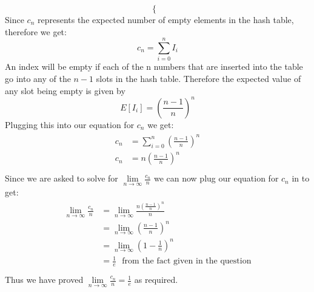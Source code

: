 \documentclass[12pt]{article}
\begin{document}
\begin{adjustwidth}{0em}{0pt}
\[\begin{cases}
\end{cases} \]
Since $c_n$ represents the expected number of empty elements in the hash table, therefore we get:
\[ c_n = \sum^{n}_{i=0}I_i \]
An index will be empty if each of the n numbers that are inserted into the table go into any of the $n-1$ slots in the hash table. Therefore the expected value of any slot being empty is given by
\[ E[I_i] = (\frac{n-1}{n})^n \]
Plugging this into our equation for $c_n$ we get:
\begin{align*}
    \begin{aligned}
       c_n &= \sum^{n}_{i=0}(\frac{n-1}{n})^n  \\
       c_n &= n(\frac{n-1}{n})^n  \\
    \end{aligned}
\end{align*}
Since we are asked to solve for $\lim\limits_{n\to \infty}\frac{c_n}{n}$ we can now plug our equation for $c_n$ in to get:
\begin{align*}
    \begin{aligned}
       \lim\limits_{n\to \infty}\frac{c_n}{n} &= \lim\limits_{n\to \infty}\frac{n(\frac{n-1}{n})^n}{n}  \\
       &= \lim\limits_{n\to \infty}(\frac{n-1}{n})^n  \\
       &= \lim\limits_{n\to \infty}(1-\frac{1}{n})^n  \\
       &= \frac{1}{e} \ \ \ \text{from the fact given in the question} \\
    \end{aligned}
\end{align*}
Thus we have proved $\lim\limits_{n\to \infty}\frac{c_n}{n} = \frac{1}{e}$ as required.




\end{adjustwidth} 
\newpage
\end{document}
